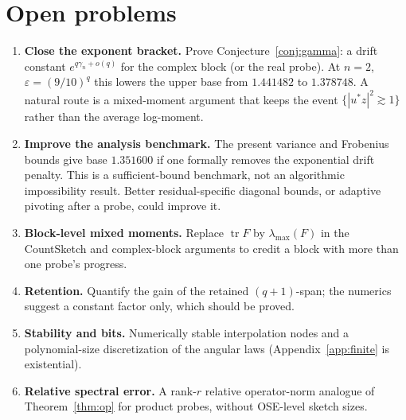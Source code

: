 \documentclass[11pt,a4paper]{article}
\theoremstyle{definition}\newtheorem{definition}[theorem]{Definition}
\theoremstyle{remark}\newtheorem{remark}[theorem]{Remark}
\numberwithin{equation}{section}
\newcommand{\tr}{\operatorname{tr}}
\newcommand{\eps}{\varepsilon}
\begin{document}
\section{Open problems}\label{sec:open}
\begin{enumerate}
\item \textbf{Close the exponent bracket.} Prove Conjecture~\ref{conj:gamma}:
a drift constant $e^{q\gamma_n+o(q)}$ for the complex block (or the real probe).
At $n=2$, $\eps=(9/10)^q$ this lowers the upper base from $1.441482$ to
$1.378748$. A natural route is a mixed-moment argument that keeps the event
$\{|u^*z|^2\gtrsim1\}$ rather than the average log-moment.
\item \textbf{Improve the analysis benchmark.} The present variance and
Frobenius bounds give base $1.351600$ if one formally removes the exponential
drift penalty. This is a sufficient-bound benchmark, not an algorithmic
impossibility result. Better residual-specific diagonal bounds, or adaptive
pivoting after a probe, could improve it.
\item \textbf{Block-level mixed moments.} Replace $\tr F$ by $\lambda_{\max}(F)$ in
the CountSketch and complex-block arguments to credit a block with more than one
probe's progress.
\item \textbf{Retention.} Quantify the gain of the retained $(q+1)$-span; the
numerics suggest a constant factor only, which should be proved.
\item \textbf{Stability and bits.} Numerically stable interpolation nodes and a
polynomial-size discretization of the angular laws (Appendix~\ref{app:finite}
is existential).
\item \textbf{Relative spectral error.} A rank-$r$ relative operator-norm
analogue of Theorem~\ref{thm:op} for product probes, without OSE-level sketch sizes.
\end{enumerate}

\appendix
\end{document}
